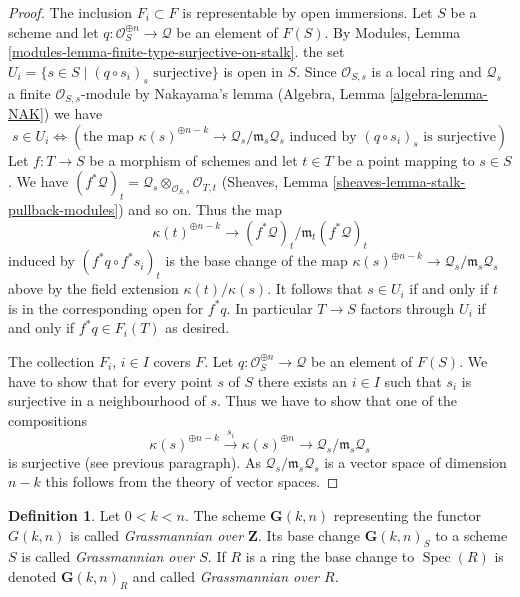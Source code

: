 \documentclass{stacks-project}
\theoremstyle{plain}
\theoremstyle{definition}
\newtheorem{definition}[subsection]{Definition}
\theoremstyle{remark}
\numberwithin{equation}{subsection}
\def\Spec{\mathop{\mathrm{Spec}}}
\begin{document}
\begin{proof}
\medskip\noindent
The inclusion $F_i \subset F$ is representable by open immersions.
Let $S$ be a scheme and let
$q : \mathcal{O}_S^{\oplus n} \to \mathcal{Q}$ be an element of
$F(S)$. By
Modules, Lemma \ref{modules-lemma-finite-type-surjective-on-stalk}.
the set $U_i = \{s \in S \mid (q \circ s_i)_s\text{ surjective}\}$
is open in $S$. Since $\mathcal{O}_{S, s}$ is a local ring
and $\mathcal{Q}_s$ a finite $\mathcal{O}_{S, s}$-module
by Nakayama's lemma (Algebra, Lemma \ref{algebra-lemma-NAK}) we have
$$
s \in U_i \Leftrightarrow
\left(
\text{the map }
\kappa(s)^{\oplus n - k} \to \mathcal{Q}_s/\mathfrak m_s\mathcal{Q}_s
\text{ induced by }
(q \circ s_i)_s
\text{ is surjective}
\right)
$$
Let $f : T \to S$ be a morphism of schemes and let $t \in T$ be a point
mapping to $s \in S$. We have
$(f^*\mathcal{Q})_t =
\mathcal{Q}_s \otimes_{\mathcal{O}_{S, s}} \mathcal{O}_{T, t}$
(Sheaves, Lemma \ref{sheaves-lemma-stalk-pullback-modules})
and so on. Thus the map
$$
\kappa(t)^{\oplus n - k} \to (f^*\mathcal{Q})_t/\mathfrak m_t(f^*\mathcal{Q})_t
$$
induced by $(f^*q \circ f^*s_i)_t$ is the base change of the map
$\kappa(s)^{\oplus n - k} \to \mathcal{Q}_s/\mathfrak m_s\mathcal{Q}_s$
above by the field extension $\kappa(t)/\kappa(s)$. It follows
that $s \in U_i$ if and only if $t$ is in the corresponding open
for $f^*q$. In particular $T \to S$ factors through $U_i$ if
and only if $f^*q \in F_i(T)$ as desired.

\medskip\noindent
The collection $F_i$, $i \in I$ covers $F$. Let
$q : \mathcal{O}_S^{\oplus n} \to \mathcal{Q}$ be an element of
$F(S)$. We have to show that for every point $s$ of $S$ there exists
an $i \in I$ such that $s_i$ is surjective in a neighbourhood of $s$.
Thus we have to show that one of the compositions
$$
\kappa(s)^{\oplus n - k} \xrightarrow{s_i}
\kappa(s)^{\oplus n} \rightarrow
\mathcal{Q}_s/\mathfrak m_s\mathcal{Q}_s
$$
is surjective (see previous paragraph). As
$\mathcal{Q}_s/\mathfrak m_s\mathcal{Q}_s$ is a vector space of
dimension $n - k$ this follows from the theory of vector spaces.
\end{proof}

\begin{definition}
\label{definition-grassmannian}
Let $0 < k < n$. The scheme $\mathbf{G}(k, n)$ representing the functor
$G(k, n)$ is called {\it Grassmannian over $\mathbf{Z}$}.
Its base change $\mathbf{G}(k, n)_S$ to a scheme $S$ is called
{\it Grassmannian over $S$}. If $R$ is a ring the base change
to $\Spec(R)$ is denoted $\mathbf{G}(k, n)_R$ and called
{\it Grassmannian over $R$}.
\end{definition}
\end{document}
